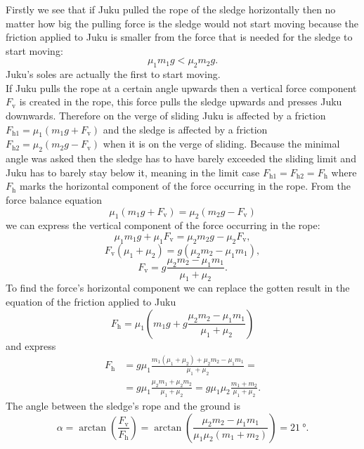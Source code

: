 {\ifEngSolution
Firstly we see that if Juku pulled the rope of the sledge horizontally then no matter how big the pulling force is the sledge would not start moving because the friction applied to Juku is smaller from the force that is needed for the sledge to start moving:
\[
\mu_1 m_1 g < \mu_2 m_2 g.
\]
Juku’s soles are actually the first to start moving.\\
If Juku pulls the rope at a certain angle upwards then a vertical force component $F_{\mathrm{v}}$ is created in the rope, this force pulls the sledge upwards and presses Juku downwards. Therefore on the verge of sliding Juku is affected by a friction $F_{\mathrm{h}1} = \mu_1 \left(m_1 g + F_{\mathrm{v}}\right)$ and the sledge is affected by a friction $F_{\mathrm{h}2} = \mu_2 \left(m_2 g - F_{\mathrm{v}}\right)$ when it is on the verge of sliding. Because the minimal angle was asked then the sledge has to have barely exceeded the sliding limit and Juku has to barely stay below it, meaning in the limit case $F_{\mathrm{h}1} = F_{\mathrm{h}2} = F_{\mathrm{h}}$ where $F_{\mathrm{h}}$ marks the horizontal component of the force occurring in the rope. From the force balance equation
\begin{equation*}
\mu_1 \left(m_1 g + F_{\mathrm{v}}\right) = \mu_2 \left(m_2 g - F_{\mathrm{v}}\right)
\end{equation*}
we can express the vertical component of the force occurring in the rope:
\begin{equation*}
\mu_1 m_1 g + \mu_1 F_{\mathrm{v}} = \mu_2 m_2 g - \mu_2 F_{\mathrm{v}},
\end{equation*}
\begin{equation*}
F_{\mathrm{v}} \left(\mu_1 + \mu_2\right) = g\left(\mu_2 m_2 - \mu_1 m_1\right),
\end{equation*}
\begin{equation*}
F_{\mathrm{v}} = g\frac{\mu_2 m_2 - \mu_1 m_1}{\mu_1 + \mu_2}.
\end{equation*}
To find the force’s horizontal component we can replace the gotten result in the equation of the friction applied to Juku
\begin{equation*}
F_{\mathrm{h}} = \mu_1 \left(m_1 g + g\frac{\mu_2 m_2 - \mu_1 m_1}{\mu_1 + \mu_2}\right)
\end{equation*}
and express
\begin{align*}
F_{\mathrm{h}} &= g \mu_1 \frac{m_1 \left(\mu_1 + \mu_2\right) + \mu_2 m_2 - \mu_1 m_1}{\mu_1 + \mu_2} = \\
&= g \mu_1 \frac{\mu_2 m_1 + \mu_2 m_2}{\mu_1 + \mu_2} = g\mu_1\mu_2\frac{m_1+m_2}{\mu_1+\mu_2}.
\end{align*}
The angle between the sledge’s rope and the ground is
\begin{equation*}
\alpha = \arctan\left(\frac{F_{\mathrm{v}}}{F_{\mathrm{h}}}\right) = \arctan\left(\frac{\mu_2 m_2 - \mu_1 m_1}{\mu_1 \mu_2 \left(m_1 + m_2\right)}\right) = \SI{21}{\degree}.
\end{equation*}
\fi
}